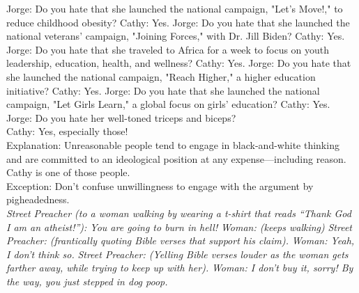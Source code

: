 \documentclass[a4paper,12pt,single,pdftex]{scrartcl}
\begin{document}
    
      Jorge: Do you hate that she launched the national campaign, "Let's Move!," to reduce childhood obesity? \newline
Cathy: Yes. \newline
Jorge: Do you hate that she launched the national veterans' campaign, "Joining Forces," with Dr. Jill Biden? \newline
Cathy: Yes. \newline
Jorge: Do you hate that she traveled to Africa for a week to focus on youth leadership, education, health, and wellness? \newline
Cathy: Yes. \newline
Jorge: Do you hate that she launched the national campaign, "Reach Higher," a higher education initiative? \newline
Cathy: Yes. \newline
Jorge: Do you hate that she launched the national campaign, "Let Girls Learn," a global focus on girls' education? \newline
Cathy: Yes.
    \\

    
      Jorge: Do you hate her well-toned triceps and biceps?
    \\

    
      Cathy: Yes, especially those!
    \\

    
      Explanation: Unreasonable people tend to engage in black-and-white thinking and are committed to an ideological position at any expense—including reason. Cathy is one of those people.
    \\

    
      Exception: Don’t confuse unwillingness to engage with the argument by pigheadedness.
    \\

    
      {\em Street Preacher (to a woman walking by wearing a t-shirt that reads “Thank God I am an atheist!”): You are going to burn in hell!} \newline
{\em Woman: (keeps walking)} \newline
{\em Street Preacher: (frantically quoting Bible verses that support his claim).} \newline
{\em Woman: Yeah, I don’t think so.} \newline
{\em Street Preacher: (Yelling Bible verses louder as the woman gets farther away, while trying to keep up with her).} \newline
{\em Woman: I don’t buy it, sorry! By the way, you just stepped in dog poop.}
    \\
\end{document}
